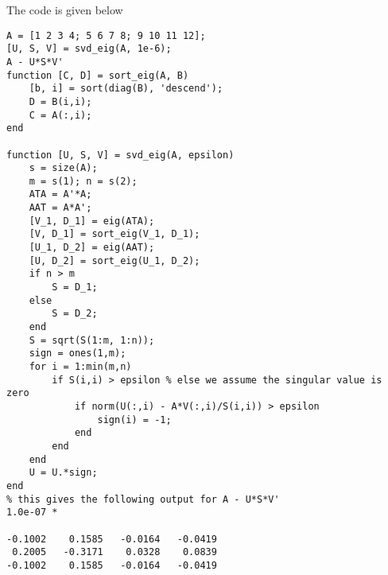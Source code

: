 \documentclass[a4paper,landscape]{article}
\begin{document}
\begin{enumerate}[(a)]
The code is given below
\begin{verbatim}
A = [1 2 3 4; 5 6 7 8; 9 10 11 12];
[U, S, V] = svd_eig(A, 1e-6);
A - U*S*V'
function [C, D] = sort_eig(A, B)
    [b, i] = sort(diag(B), 'descend');
    D = B(i,i);
    C = A(:,i);
end

function [U, S, V] = svd_eig(A, epsilon)
    s = size(A);
    m = s(1); n = s(2);
    ATA = A'*A;
    AAT = A*A';
    [V_1, D_1] = eig(ATA);
    [V, D_1] = sort_eig(V_1, D_1);
    [U_1, D_2] = eig(AAT);
    [U, D_2] = sort_eig(U_1, D_2);
    if n > m
        S = D_1;
    else
        S = D_2;
    end
    S = sqrt(S(1:m, 1:n));
    sign = ones(1,m);
    for i = 1:min(m,n)
        if S(i,i) > epsilon % else we assume the singular value is zero
            if norm(U(:,i) - A*V(:,i)/S(i,i)) > epsilon
                sign(i) = -1;
            end
        end
    end
    U = U.*sign;
end
% this gives the following output for A - U*S*V'
1.0e-07 *

-0.1002    0.1585   -0.0164   -0.0419
 0.2005   -0.3171    0.0328    0.0839
-0.1002    0.1585   -0.0164   -0.0419
\end{verbatim}
\end{enumerate}
\end{document}
